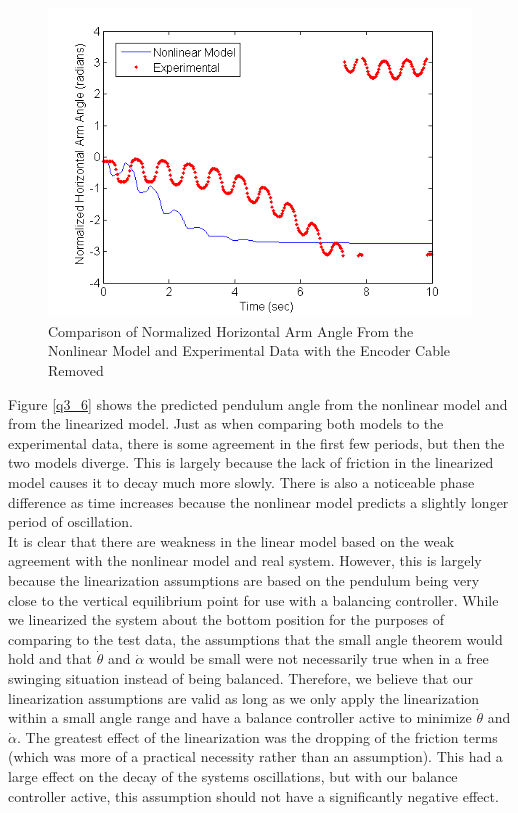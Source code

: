 \documentclass{article}
\theoremstyle{plain}
\theoremstyle{definition}
\theoremstyle{remark}
\begin{document}
\begin{figure}[hbt]
\begin{center}
\includegraphics[width = 13cm]{thetaNoCord.png}
\end{center}
\caption{Comparison of Normalized Horizontal Arm Angle From the Nonlinear Model and Experimental Data with the Encoder Cable Removed}
\label{q3_5}
\end{figure}

Figure \ref{q3_6} shows the predicted pendulum angle from the nonlinear model and from the linearized model. Just as when comparing both models to the experimental data, there is some agreement in the first few periods, but then the two models diverge. This is largely because the lack of friction in the linearized model causes it to decay much more slowly. There is also a noticeable phase difference as time increases because the nonlinear model predicts a slightly longer period of oscillation. \\

It is clear that there are weakness in the linear model based on the weak agreement with the nonlinear model and real system. However, this is largely because the linearization assumptions are based on the pendulum being very close to the vertical equilibrium point for use with a balancing controller. While we linearized the system about the bottom position for the purposes of comparing to the test data, the assumptions that the small angle theorem would hold and that $\dot{\theta}$ and $\dot{\alpha}$ would be small were not necessarily true when in a free swinging situation instead of being balanced. Therefore, we believe that our linearization assumptions are valid as long as we only apply the linearization within a small angle range and have a balance controller active to minimize $\dot{\theta}$ and $\dot{\alpha}$. The greatest effect of the linearization was the dropping of the friction terms (which was more of a practical necessity rather than an assumption). This had a large effect on the decay of the systems oscillations, but with our balance controller active, this assumption should not have a significantly negative effect.\\
\end{document}
